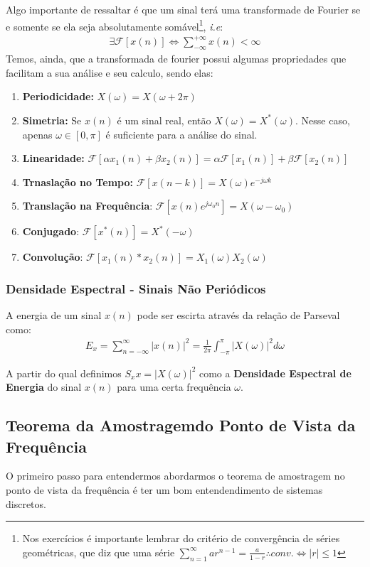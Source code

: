 \documentclass{article}
\begin{document}
Algo importante de ressaltar é que um sinal terá uma transformade de Fourier se e somente se ela seja absolutamente somável\footnote{Nos exercícios é importante lembrar do critério de convergência de séries geométricas, que diz que uma série $\sum ^\infty _{n = 1} a r^{n-1} = \frac{a}{1 - r} \therefore conv. \iff |r| \le 1$}, \emph{i.e}:
\begin{align}
    \exists\mathcal{F}[x(n)]  \iff \sum^{+\infty} _{-\infty} x(n) < \infty
\end{align}
Temos, ainda, que a transformada de fourier possui algumas propriedades que facilitam a sua análise e seu calculo, sendo elas:
\begin{enumerate}
    \item \textbf{Periodicidade:} $X(\omega) = X(\omega + 2\pi)$
    \item \textbf{Simetria:} Se $x(n)$ é um sinal real, então $X(\omega) = X^*(\omega)$. Nesse caso, apenas $\omega \in [0,\pi]$ é suficiente para a análise do sinal.
    \item \textbf{Linearidade:} $\mathcal{F}[\alpha x_1(n) + \beta x_2(n)] = \alpha \mathcal{F}[x_1(n)] + \beta \mathcal{F}[x_2(n)]$
    \item \textbf{Trnaslação no Tempo:} $\mathcal{F}[x(n-k)] = X(\omega) e^{-j\omega k}$
    \item  \textbf{Translação na Frequência}: $\mathcal{F}[x(n) e^{j\omega_0n}] = X(\omega - \omega_0)$
    \item  \textbf{Conjugado}: $\mathcal{F}[x^*(n)] = X^*(-\omega)$
    \item  \textbf{Convolução}: $\mathcal{F}[x_1(n) * x_2(n)] = X_1(\omega) X_2(\omega)$
\end{enumerate}

\subsubsection{Densidade Espectral - Sinais Não Periódicos}
A energia de um sinal $x(n)$ pode ser escirta através da relação de Parseval como:
\begin{align}
    E_x = \sum^\infty _{n=-\infty} |x(n)|^2 = \frac{1}{2\pi} \int^\pi _{-\pi} |X(\omega)|^2 d\omega
\end{align}

A partir do qual definimos $S_xx = |X(\omega)|^2$ como a \textbf{Densidade Espectral de Energia} do sinal $x(n)$ para uma certa frequência $\omega$.

\subsection{Teorema da Amostragemdo Ponto de Vista da Frequência}
O primeiro passo para entendermos abordarmos o teorema de amostragem no ponto de vista da frequência é ter um bom entendendimento de sistemas discretos. 
\end{document}
